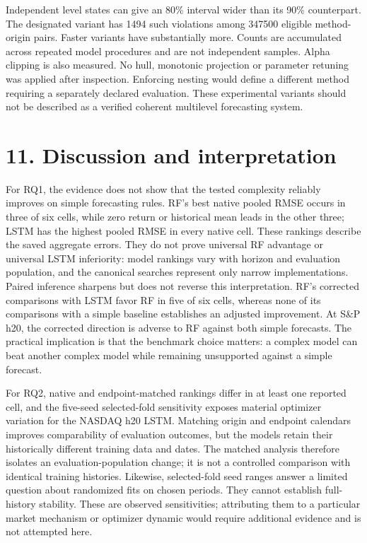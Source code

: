 \documentclass[11pt]{article}
\begin{document}
Independent level states can give an 80\% interval wider than its 90\% counterpart. The designated variant has 1494 such violations among 347500 eligible method-origin pairs. Faster variants have substantially more. Counts are accumulated across repeated model procedures and are not independent samples. Alpha clipping is also measured. No hull, monotonic projection or parameter retuning was applied after inspection. Enforcing nesting would define a different method requiring a separately declared evaluation. These experimental variants should not be described as a verified coherent multilevel forecasting system.

\section*{11. Discussion and interpretation}

For RQ1, the evidence does not show that the tested complexity reliably improves on simple forecasting rules. RF's best native pooled RMSE occurs in three of six cells, while zero return or historical mean leads in the other three; LSTM has the highest pooled RMSE in every native cell. These rankings describe the saved aggregate errors. They do not prove universal RF advantage or universal LSTM inferiority: model rankings vary with horizon and evaluation population, and the canonical searches represent only narrow implementations. Paired inference sharpens but does not reverse this interpretation. RF's corrected comparisons with LSTM favor RF in five of six cells, whereas none of its comparisons with a simple baseline establishes an adjusted improvement. At S\&P h20, the corrected direction is adverse to RF against both simple forecasts. The practical implication is that the benchmark choice matters: a complex model can beat another complex model while remaining unsupported against a simple forecast.

For RQ2, native and endpoint-matched rankings differ in at least one reported cell, and the five-seed selected-fold sensitivity exposes material optimizer variation for the NASDAQ h20 LSTM. Matching origin and endpoint calendars improves comparability of evaluation outcomes, but the models retain their historically different training data and dates. The matched analysis therefore isolates an evaluation-population change; it is not a controlled comparison with identical training histories. Likewise, selected-fold seed ranges answer a limited question about randomized fits on chosen periods. They cannot establish full-history stability. These are observed sensitivities; attributing them to a particular market mechanism or optimizer dynamic would require additional evidence and is not attempted here.
\end{document}
